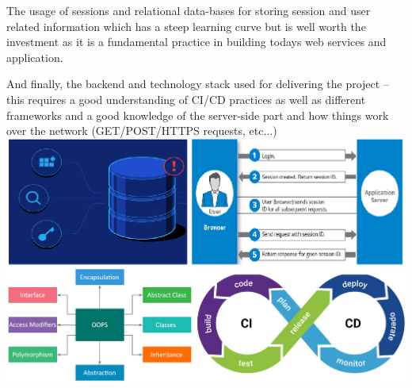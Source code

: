 The usage of sessions and relational data-bases for storing session and user related information which has a steep learning curve but is well worth the investment as it is a fundamental practice in building todays web services and application. 

And finally, the backend and technology stack used for delivering the project – this requires a good understanding of CI/CD practices as well as different frameworks and a good knowledge of the server-side part and how things work over the network (GET/POST/HTTPS requests, etc...) 
\includegraphics[width=\textwidth]{fotka1}

